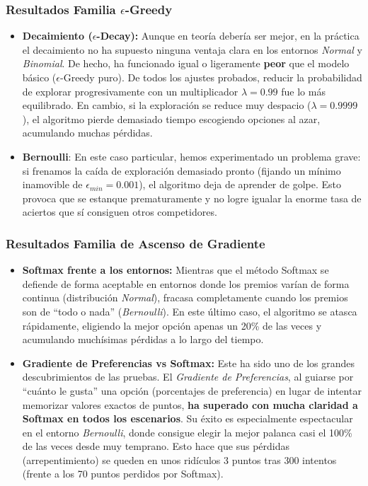 \subsubsection{\texorpdfstring{Resultados Familia
\(\epsilon\)-Greedy}{Resultados Familia \textbackslash epsilon-Greedy}}\label{resultados-familia-epsilon-greedy}

\begin{itemize}

\item
  \textbf{Decaimiento (\(\epsilon\)-Decay):} Aunque en teoría debería
  ser mejor, en la práctica el decaimiento no ha supuesto ninguna
  ventaja clara en los entornos \emph{Normal} y \emph{Binomial}. De
  hecho, ha funcionado igual o ligeramente \textbf{peor} que el modelo
  básico (\(\epsilon\)-Greedy puro). De todos los ajustes probados,
  reducir la probabilidad de explorar progresivamente con un
  multiplicador \(\lambda=0.99\) fue lo más equilibrado. En cambio, si
  la exploración se reduce muy despacio (\(\lambda=0.9999\)), el
  algoritmo pierde demasiado tiempo escogiendo opciones al azar,
  acumulando muchas pérdidas.
\item
  \textbf{Bernoulli}: En este caso particular, hemos experimentado un
  problema grave: si frenamos la caída de exploración demasiado pronto
  (fijando un mínimo inamovible de \(\epsilon_{min}=0.001\)), el
  algoritmo deja de aprender de golpe. Esto provoca que se estanque
  prematuramente y no logre igualar la enorme tasa de aciertos que sí
  consiguen otros competidores.
\end{itemize}

\subsubsection{Resultados Familia de Ascenso de
Gradiente}\label{resultados-familia-de-ascenso-de-gradiente}

\begin{itemize}

\item
  \textbf{Softmax frente a los entornos:} Mientras que el método Softmax
  se defiende de forma aceptable en entornos donde los premios varían de
  forma continua (distribución \emph{Normal}), fracasa completamente
  cuando los premios son de ``todo o nada'' (\emph{Bernoulli}). En este
  último caso, el algoritmo se atasca rápidamente, eligiendo la mejor
  opción apenas un 20\% de las veces y acumulando muchísimas pérdidas a
  lo largo del tiempo.
\item
  \textbf{Gradiente de Preferencias vs Softmax:} Este ha sido uno de los
  grandes descubrimientos de las pruebas. El \emph{Gradiente de
  Preferencias}, al guiarse por ``cuánto le gusta'' una opción
  (porcentajes de preferencia) en lugar de intentar memorizar valores
  exactos de puntos, \textbf{ha superado con mucha claridad a Softmax en
  todos los escenarios}. Su éxito es especialmente espectacular en el
  entorno \emph{Bernoulli}, donde consigue elegir la mejor palanca casi
  el 100\% de las veces desde muy temprano. Esto hace que sus pérdidas
  (arrepentimiento) se queden en unos ridículos 3 puntos tras 300
  intentos (frente a los 70 puntos perdidos por Softmax).
\end{itemize}

